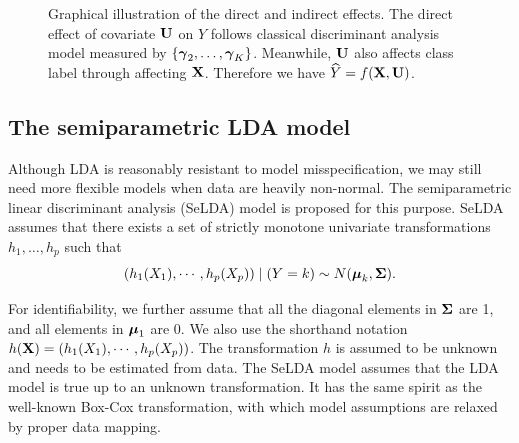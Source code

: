 \begin{figure}[t!]
 \begin{center}
 \end{center}
 \caption{\label{fig:covariate} Graphical illustration of the direct and indirect effects. The direct effect of covariate $\mathbf{U}$ on $Y$ follows classical discriminant analysis model measured by $\{\boldsymbol{\gamma}_2,\ldots,\boldsymbol{\gamma}_K\}$. Meanwhile, $\mathbf{U}$ also affects class label through affecting $\mathbf{X}$. Therefore we have $\widehat{Y}=f(\mathbf{X}, \mathbf{U})$.
 }
\end{figure}



\subsection{The semiparametric LDA model}\label{Sec: SeLDA}

Although LDA is reasonably resistant to model misspecification, we may still need more flexible models when data are heavily non-normal. The semiparametric linear discriminant analysis (SeLDA) model \citep{Lin2003} is proposed for this purpose. SeLDA assumes that there exists a set of strictly monotone univariate transformations $h_1,\ldots,h_p$ such that 
\begin{equation}\label{sesda}
(h_1(X_1),\cdots, h_p(X_p))\mid (Y=k)\sim N(\boldsymbol{\mu}_k,\boldsymbol{\Sigma}).
\end{equation} 

For identifiability, we further assume that all the diagonal elements in $\boldsymbol{\Sigma}$ are 1, and all elements in $\boldsymbol{\mu}_1$ are 0. We also use the shorthand notation $h(\mathbf{X})=(h_1(X_1),\cdots, h_p(X_p))$. The transformation $h$ is assumed to be unknown and needs to be estimated from data. The SeLDA model assumes that the LDA model is true up to an unknown transformation. It has the same spirit as the well-known Box-Cox transformation, with which model assumptions are relaxed by proper data mapping. 




